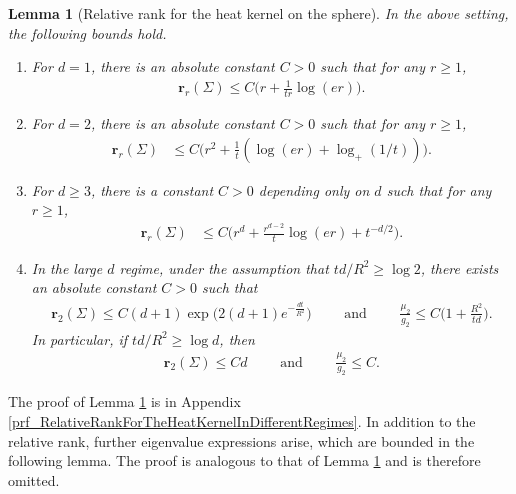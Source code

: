 \documentclass[a4paper,11pt]{article} %
\numberwithin{equation}{section}
\theoremstyle{definition}
\theoremstyle{remark}
\theoremstyle{plain}
\newtheorem{lemma}[definition]{Lemma}
\begin{document}
\begin{lemma}[Relative rank for the heat kernel on the sphere]%
  \label{lem_RelativeRankForTheHeatKernelInDifferentRegimes}
  In the above setting, the following bounds hold.
  \begin{enumerate}[label=(\roman*)]
    \item 
      For \( d = 1 \), there is an absolute constant \( C > 0 \) such that for any \( r \ge 1 \),
      \begin{align}
        \mathbf{r}_r(\Sigma) \le C \Big( r+ \frac{1}{tr} \log(er) \Big).
      \end{align}

    \item 
      For \( d = 2 \), there is an absolute constant \( C > 0 \) such that for any \( r \ge 1 \),
      \begin{align}
        \mathbf{r}_r(\Sigma) & \le C\Big( r^{2} + \frac{1}{t}(\log(e r) + \log_+(1/t)) \Big).
      \end{align}

    \item
      For \( d \ge 3 \), there is a constant $C>0$ depending only on $d$ such that  for any \( r \ge 1 \),
      \begin{align}
        \mathbf{r}_r(\Sigma) & \le C\Big( r^{d} + \frac{r^{d-2}}{t} \log(er) + t^{-d/2} \Big).
      \end{align}
      
    \item 
      In the large \( d \) regime, under the assumption that  \( t d / R^2 \ge \log 2 \), there exists an absolute constant $ C > 0 $ such that 
      \begin{align}
        \mathbf{r}_2(\Sigma) \le C (d + 1) \exp \Big( 2 (d + 1) e^{-\frac{d t}{R^2}} \Big)
        \qquad \text{ and } \qquad 
        \frac{\mu_{2}}{g_2} \le C \Big( 1 + \frac{R^{2}}{t d} \Big).
      \end{align}
      In particular, if \( t d / R^2 \ge \log d \), then 
      \begin{align}
        \mathbf{r}_2(\Sigma) \le  C d
        \qquad \text{ and } \qquad 
        \frac{\mu_{2}}{g_2} \le C.
      \end{align}
  \end{enumerate}
\end{lemma}%

The proof of Lemma \ref{lem_RelativeRankForTheHeatKernelInDifferentRegimes} is in Appendix \ref{prf_RelativeRankForTheHeatKernelInDifferentRegimes}. In addition to the relative rank, further eigenvalue expressions arise, which are bounded in the following lemma. The proof is analogous to that of Lemma \ref{lem_RelativeRankForTheHeatKernelInDifferentRegimes} and is therefore omitted.
\end{document}
